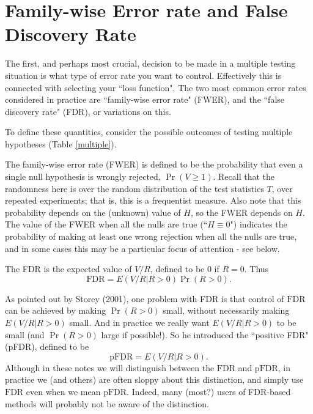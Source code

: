 \documentclass[times,11pt]{article}
\def\FDR{\text{FDR}}
\def\pFDR{\text{pFDR}}
\begin{document}
\section{Family-wise Error rate and False Discovery Rate}

The first, and perhaps most crucial, decision to be made in a multiple testing situation is what type of error rate you want to control. Effectively this is connected with selecting your ``loss function".
The two most common error rates considered in practice are ``family-wise error rate" (FWER), and
the ``false discovery rate" (FDR), or variations on this.

To define these quantities, consider the possible outcomes of testing multiple hypotheses (Table \ref{multiple}).
 
The family-wise error rate (FWER) is defined to be
the probability that even a single null hypothesis is wrongly rejected, $\Pr(V \geq 1)$.  Recall that the randomness here is over the random distribution of the test statistics $T$, over repeated experiments; that is, this is a frequentist measure. Also note that this probability depends on the (unknown) value of $H$, so the FWER depends on $H$. The value of the FWER when all the nulls are true (``$H \equiv 0$") indicates
the probability of making at least one wrong rejection when all the nulls are true, and in some cases this may be a particular focus of attention - see below.

The FDR is the expected value of $V/R$, defined to be 0 if $R=0$. Thus
\begin{equation}
\FDR = E(V/R | R>0) \Pr(R>0).
\end{equation}

As pointed out by Storey (2001), one problem with FDR is that control of $\FDR$ can be achieved by making $\Pr(R>0)$ small, without necessarily making $E(V/R | R>0)$ small. And in practice we
really want $E(V/R | R>0)$ to be small (and $\Pr(R>0)$ large if possible!). So he introduced the
``positive FDR" (pFDR), defined to be
\begin{equation}
\pFDR = E(V/R | R>0).
\end{equation}
Although in these notes we will distinguish between the $\FDR$ and $\pFDR$, in practice we (and others) are often sloppy
about this distinction, and simply use $\FDR$ even when we mean $\pFDR$. Indeed, many (most?) users of FDR-based methods
will probably not be aware of the distinction.
\end{document}
